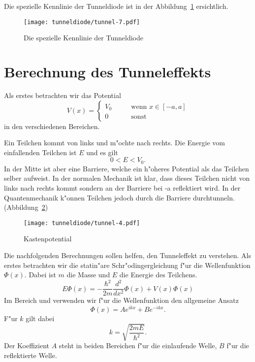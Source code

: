 \begin{refsection}
Die spezielle Kennlinie der Tunneldiode ist in der Abbildung~\ref{skript:Tunneldiode} ersichtlich.

\begin{figure}	%
\centering
\texttt{[image: tunneldiode/tunnel-7.pdf]}
\caption{Die spezielle Kennlinie der Tunneldiode
\label{skript:Tunneldiode}}
\end{figure}

\section{Berechnung des Tunneleffekts}
Als erstes betrachten wir das Potential 
\[
V(x)=\begin{cases}
V_0& \qquad \text{wenn } x \in [-a,a]\\
0&   \qquad \text{sonst}
\end{cases}
\]
in den verschiedenen Bereichen.

Ein Teilchen kommt von links und m"ochte nach rechts. Die Energie vom einfallenden Teilchen ist $E$ und es gilt
\[
0 < E < V_0.
\]
In der Mitte ist aber eine Barriere, welche ein h"oheres Potential als das Teilchen selber aufweist. In der normalen Mechanik ist klar, dass dieses Teilchen nicht von links nach rechts kommt sondern an der Barriere bei -a reflektiert wird. In der Quantenmechanik k"onnen Teilchen jedoch durch die Barriere durchtunneln. (Abbildung~\ref{skript:Kastenpotential})

\begin{figure}	%
\centering
\texttt{[image: tunneldiode/tunnel-4.pdf]}
\caption{Kastenpotential
\label{skript:Kastenpotential}}
\end{figure}

Die nachfolgenden Berechnungen sollen helfen, den Tunneleffekt zu verstehen.  Als erstes betrachten wir die statin"are Schr"odingergleichung f"ur die Wellenfunktion $\Phi(x)$. Dabei ist $m$ die Masse und $E$ die Energie des Teilchens.
\[
E\Phi(x) = -\frac{\hbar^2}{2m}\frac{d^2}{dx^2}\Phi(x) + V(x)\Phi(x)
\]
Im Bereich  und  verwenden wir f"ur die Wellenfunktion den allgemeine Ansatz
\[
\Phi(x) = Ae^{ikx}+Be^{-ikx}.
\]
F"ur $k$ gilt dabei
\[
k = \sqrt{\frac{2mE}{\hbar^2}}.
\]
Der Koeffizient $A$ steht in beiden Bereichen f"ur die einlaufende Welle, $B$ f"ur die reflektierte Welle.


\end{refsection}
